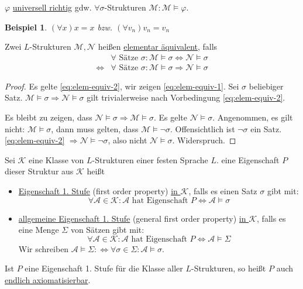 \documentclass{article}
\theoremstyle{definition}
\theoremstyle{plain}
\newtheorem*{bsp}{Beispiel}
\newcommand{\calA}{\mathcal{A}}
\newcommand{\calK}{\mathcal{K}}
\newcommand{\calM}{\mathcal{M}}
\newcommand{\calN}{\mathcal{N}}
\begin{document}
    $ \varphi $ \underline{universell richtig} gdw. $ \forall \sigma$-Strukturen $ \calM: \calM \models \varphi $.
    \begin{bsp}
        $ (\forall x) x = x $ bzw. $ (\forall v_n) v_n = v_n $
    \end{bsp}

    Zwei $ L $-Strukturen $ \calM, \calN $ heißen \underline{elementar äquivalent}, falls
    \begin{align}
        & \forall \text{ Sätze } \sigma: \calM \models \sigma \Leftrightarrow \calN \models \sigma \label{eq:elem-equiv-1} \\
        \Leftrightarrow & \forall \text{ Sätze } \sigma: \calM \models \sigma \Rightarrow \calN \models \sigma \label{eq:elem-equiv-2}
    \end{align}

    \begin{proof}
        Es gelte \eqref{eq:elem-equiv-2}, wir zeigen \eqref{eq:elem-equiv-1}.
        Sei $ \sigma $ beliebiger Satz.
        $ \calM \models \sigma \Rightarrow \calN \models \sigma $
        gilt trivialerweise nach Vorbedingung \eqref{eq:elem-equiv-2}.

        Es bleibt zu zeigen, dass $ \calN \models \sigma \Rightarrow \calM \models \sigma $.
        Es gelte $ \calN \models \sigma $.
        Angenommen, es gilt nicht: $ \calM \models \sigma $, dann muss gelten, dass $ \calM \models \neg \sigma $.
        Offensichtlich ist $ \neg \sigma $ ein Satz.
        \eqref{eq:elem-equiv-2} $ \Rightarrow \calN \models \neg \sigma $, also nicht $ \calN \models \sigma $. Widerspruch.
    \end{proof}

    Sei $ \calK $ eine Klasse von $ L $-Strukturen einer festen Sprache $ L $.
    eine Eigenschaft $ P$ dieser Struktur aus $ \calK $ heißt
    \begin{itemize}
        \item \underline{Eigenschaft 1. Stufe} (first order property) \underline{in $ \calK $}, falls es einen Satz $ \sigma $ gibt mit:
        \begin{equation*}
            \forall \calA \in \calK : \calA \text{ hat Eigenschaft } P \Leftrightarrow \calA \models \sigma
        \end{equation*}
        \item \underline{allgemeine Eigenschaft 1. Stufe} (general first order property) \underline{in $ \calK $}, falls es eine Menge $ \Sigma $ von Sätzen gibt mit:
        \begin{equation*}
            \forall \calA \in \calK : \calA \text{ hat Eigenschaft } P \Leftrightarrow \calA \models \Sigma
        \end{equation*}
        Wir schreiben $ \calA \models \Sigma :\Leftrightarrow \forall \sigma \in \Sigma: \calA \models \sigma $.
    \end{itemize}
    Ist $ P $ eine Eigenschaft 1. Stufe für die Klasse aller $ L $-Strukturen, so heißt $ P $ auch \underline{endlich axiomatisierbar}.
\end{document}
